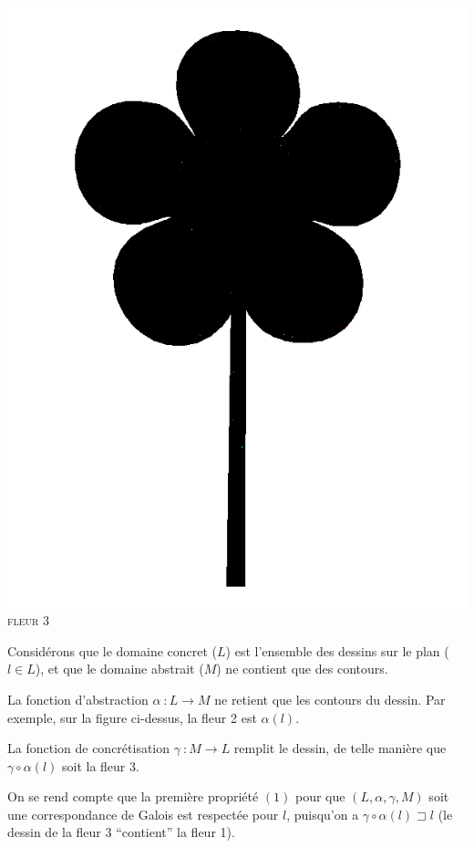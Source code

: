 \documentclass[french]{article}
\begin{document}
\begin{center}
\begin{minipage}{.3\textwidth}
\begin{center}
	\includegraphics[scale=0.19]{./pictures/flower3.png}\\
	\textsc{fleur 3}
      \end{center}
    \end{minipage}
  \end{center}

  Considérons que le domaine concret ($L$) est l'ensemble des dessins sur le plan ($l \in L$), et que le domaine abstrait ($M$) ne contient que des contours.

  La fonction d'abstraction $\alpha\ : L \rightarrow M$ ne retient que les contours du dessin. Par exemple, sur la figure ci-dessus, la fleur 2 est $\alpha (l)$.

  La fonction de concrétisation $\gamma\ : M \rightarrow L$ remplit le dessin, de telle manière que $\gamma \circ \alpha (l)$  soit la fleur 3.

  On se rend compte que la première propriété $(1)$ pour que $(L, \alpha, \gamma, M)$ soit une correspondance de Galois est respectée pour $l$, puisqu'on a $\gamma \circ \alpha (l) \sqsupset l$ (le dessin de la fleur 3 ``contient'' la fleur 1).
\end{document}

